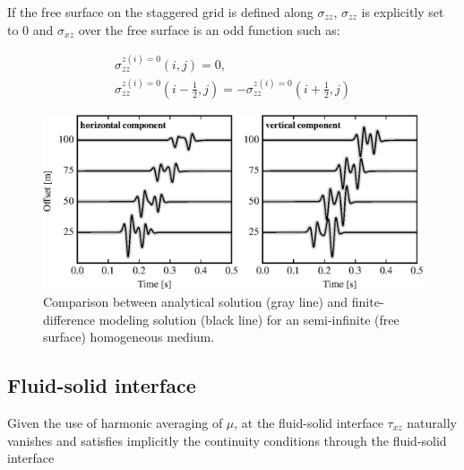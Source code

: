 \documentclass{gnulike}
\begin{document}
\noindent If the free surface on the staggered grid is defined along $\sigma_{zz}$, $\sigma_{zz}$ is explicitly set to $0$ and $\sigma_{xz}$ over the free surface is an odd function such as:

\begin{eqnarray}
  \sigma_{zz}^{z(i)=0}(i,j) = 0, \nonumber \\
  \sigma_{zz}^{z(i)=0}(i-\frac{1}{2},j) = -\sigma_{zz}^{z(i)=0}(i+\frac{1}{2},j)
\end{eqnarray}

\begin{figure}[!ht]
  \centering
  \includegraphics[width=0.9\columnwidth]{fig/validation_trac_fsurf.eps}
  \caption{Comparison between analytical solution (gray line) and finite-difference modeling solution (black line) for an semi-infinite (free surface) homogeneous medium.}
  \label{fig:validation_trac_fsurf}
\end{figure}

\subsection{Fluid-solid interface}

Given the use of harmonic averaging of $\mu$, at the fluid-solid interface $\tau_{xz}$ naturally vanishes and satisfies implicitly the continuity conditions through the fluid-solid interface \citep{vanvossen2002finite}
\end{document}
